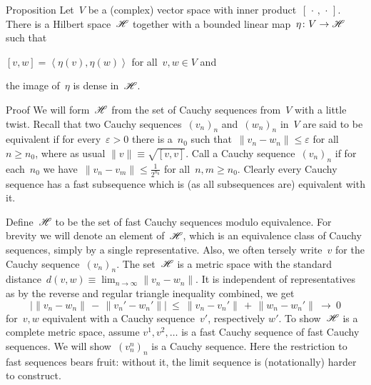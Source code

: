\begin{parsec}
\begin{point}{Proposition}%
    Let~$V$ be a (complex) vector space with inner
        product~$[\,\cdot\,,\,\cdot\,]$.
    There is a Hilbert space~$\mathscr{H}$
        together with a bounded linear map~$\eta\colon V \to \mathscr{H}$
            such that
        \begin{inparaenum}
        \item
        $[v,w] = \left<\eta(v), \eta(w)\right>$
            for all~$v,w \in V$ and
        \item
        the image of~$\eta$ is dense in~$\mathscr{H}$.
        \end{inparaenum}
\begin{point}{Proof}%
We will form~$\mathscr{H}$ from the set of Cauchy sequences from~$V$
    with a little twist.
Recall that two Cauchy
    sequences~$(v_n)_n$ and~$(w_n)_n$ in~$V$
    are said to be equivalent
    if for every~$\varepsilon > 0$
    there is a~$n_0$
    such that~$\| v_n - w_n \| \leq \varepsilon$
    for all~$n \geq n_0$,
    where as usual $\|v\| \equiv \sqrt{[v,v]}$.
Call a Cauchy sequence~$(v_n)_n$ 
    if for each~$n_0$
    we have~$\| v_n - v_m\| \leq \frac{1}{2^{n_0}}$
    for all~$n,m \geq n_0$.
Clearly every Cauchy sequence has a fast subsequence
    which is (as all subsequences are) equivalent with it.
\begin{point}%
    Define~$\mathscr{H}$ to be the set of fast Cauchy sequences modulo
        equivalence.
For brevity we will denote an element of~$\mathscr{H}$,
    which is an equivalence class of Cauchy sequences, simply by
    a single representative.
Also, we often tersely write~$v$ for the Cauchy sequence~$(v_n)_n$.
The set~$\mathscr{H}$ is a metric space
    with the standard
    distance~$d(v, w) \equiv \lim_{n\to\infty} \| v_n - w_n\|$.
It is independent of representatives
    as by the reverse and regular triangle inequality combined,
     we get
\begin{equation*}
    \bigl| \| v_n - w_n \| \,-\, \| v_n' - w_n' \| \bigr|
        \ \leq \ 
    \| v_n - v_n' \| \,+\, \|w_n - w_n'\| \ \rightarrow \ 0
\end{equation*}
for~$v,w$ equivalent with a Cauchy sequence~$v'$, respectively $w'$.
To show~$\mathscr{H}$ is a complete metric space, assume
$v^1, v^2, \ldots$
is a fast Cauchy sequence of fast Cauchy sequences.
We will show~$(v_n^n)_n$ is a Cauchy sequence.
Here the restriction to fast sequences bears fruit:
without it, the limit sequence is (notationally) harder to construct.

\end{point}
\end{point}
\end{point}
\end{parsec}
